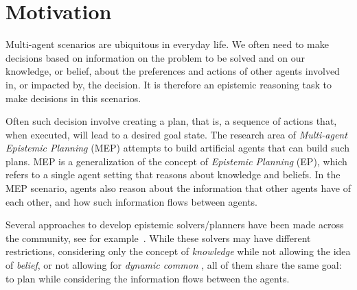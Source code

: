 \section{Motivation}

Multi-agent scenarios are ubiquitous in everyday life. We often need to make decisions based on information on the problem to be solved and on our knowledge, or belief, about the preferences and actions of other agents involved in, or impacted by, the decision.
It is therefore an epistemic reasoning task to make decisions in this scenarios.

Often such decision involve creating a plan, that is, a sequence of actions that, when executed, will lead to a desired goal state.
The research area of \emph{Multi-agent Epistemic Planning} (MEP) attempts to build artificial agents that can build such plans. 
MEP is a generalization of the concept of \emph{Epistemic Planning} (EP),
which refers to a single agent setting that reasons about knowledge and beliefs. In the MEP scenario, agents also reason about 
the information that other agents have of each other, and how such information flows between agents.

Several approaches to develop epistemic solvers/planners have been made across the community, see for example~\cite{baral2015action,muise2015planning,Fab20}.
While these solvers may have different restrictions, \eg considering only the concept of \emph{knowledge} while not allowing the idea of \emph{belief}, or not allowing for \emph{dynamic common \knobel}, all of them share the same goal: to plan while considering the information flows between the agents.

